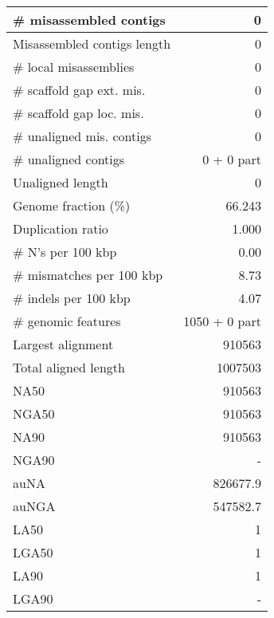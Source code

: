 \documentclass[12pt,a4paper]{article}
\begin{document}
\begin{table}[ht]
\begin{center}
\begin{tabular}{|l*{1}{|r}|}
\# misassembled contigs & 0 \\ \hline
Misassembled contigs length & 0 \\ \hline
\# local misassemblies & 0 \\ \hline
\# scaffold gap ext. mis. & 0 \\ \hline
\# scaffold gap loc. mis. & 0 \\ \hline
\# unaligned mis. contigs & 0 \\ \hline
\# unaligned contigs & 0 + 0 part \\ \hline
Unaligned length & 0 \\ \hline
Genome fraction (\%) & 66.243 \\ \hline
Duplication ratio & 1.000 \\ \hline
\# N's per 100 kbp & 0.00 \\ \hline
\# mismatches per 100 kbp & 8.73 \\ \hline
\# indels per 100 kbp & 4.07 \\ \hline
\# genomic features & 1050 + 0 part \\ \hline
Largest alignment & 910563 \\ \hline
Total aligned length & 1007503 \\ \hline
NA50 & 910563 \\ \hline
NGA50 & 910563 \\ \hline
NA90 & 910563 \\ \hline
NGA90 & - \\ \hline
auNA & 826677.9 \\ \hline
auNGA & 547582.7 \\ \hline
LA50 & 1 \\ \hline
LGA50 & 1 \\ \hline
LA90 & 1 \\ \hline
LGA90 & - \\ \hline
\end{tabular}
\end{center}
\end{table}
\end{document}
